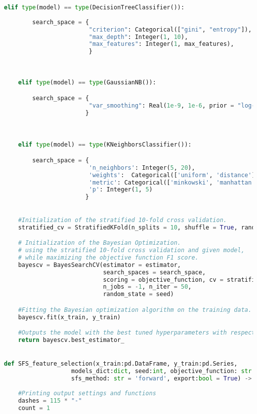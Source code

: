 \begin{lstlisting}[language=Python, basicstyle=\footnotesize\ttfamily]
    elif type(model) == type(DecisionTreeClassifier()):
        
        search_space = {
                        "criterion": Categorical(["gini", "entropy"]),
                        "max_depth": Integer(1, 10),
                        "max_features": Integer(1, max_features),
                        }  
        


    elif type(model) == type(GaussianNB()):

        search_space = {
                        "var_smoothing": Real(1e-9, 1e-6, prior = "log-uniform")
                       }



    elif type(model) == type(KNeighborsClassifier()):

        search_space = {
                        'n_neighbors': Integer(5, 20),
                        'weights':  Categorical(['uniform', 'distance']),
                        'metric': Categorical(['minkowski', 'manhattan', 'euclidean']),
                        'p': Integer(1, 5)
                       }

        
    #Initialization of the stratified 10-fold cross validation.
    stratified_cv = StratifiedKFold(n_splits = 10, shuffle = True, random_state = seed)

    # Initialization of the Bayesian Optimization.
    # using the stratified 10-fold cross validation and given model,
    # while maximizing the objective function F1 score.
    bayescv = BayesSearchCV(estimator = estimator,
                            search_spaces = search_space,
                            scoring = objective_function, cv = stratified_cv,
                            n_jobs = -1, n_iter = 50,
                            random_state = seed)

    #Fitting the Bayesian optimization algorithm on the training data.
    bayescv.fit(x_train, y_train)

    #Outputs the model with the best tuned hyperparameters with respect to F1 score.
    return bayescv.best_estimator_


def SFS_feature_selection(x_train:pd.DataFrame, y_train:pd.Series,
                   models_dict:dict, seed:int, objective_function: str = "f1", 
                   sfs_method: str = 'forward', export:bool = True) -> pd.DataFrame:
    
    #Printing output settings and functions
    dashes = 115 * "-"
    count = 1


\end{lstlisting}
